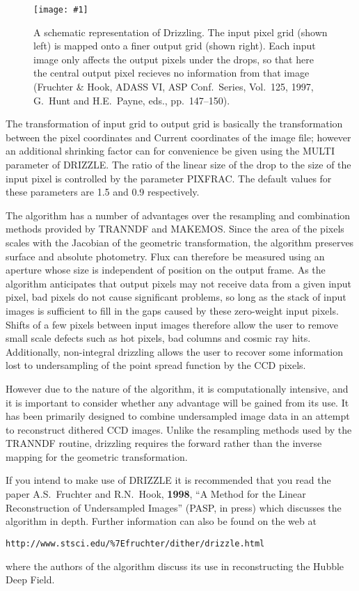 \documentclass[twoside,11pt]{article}
\newcommand{\htmladdnormallink}[2]{#1}
\newcommand{\htmladdimg}[1]{}
\renewcommand{\_}{\texttt{\symbol{95}}}
\newcommand{\routine}[1]{{\sc #1}}
\newcommand{\myfig} [5] {
  \begin{figure}
    \centering\texttt{[image: \#1]}
    \typeout{#1 inserted on page \arabic{page}}
    \caption{\label{#4}#5}
  \end{figure}
  }
\newcommand{\myfig}[5]{
    \htmladdimg{#3}\\
    Figure: \label{#4} #5
    }
\begin{document}
\myfig{sun139driz.eps}{height=0.5\textheight}{driz.gif}{drizzlepicture}
{A schematic representation of Drizzling. The input pixel grid
(shown left) is mapped onto a finer output grid (shown right).
Each input image only affects the output pixels under the drops,
so that here the central output pixel recieves no information
from that image (Fruchter \& Hook, ADASS VI,
ASP Conf.\ Series, Vol.\ 125, 1997, G.~Hunt and H.E.~Payne, eds., pp.\
147--150).}

The transformation of input grid to output grid is basically the 
transformation between the pixel coordinates and Current coordinates
of the image file;
however an additional shrinking
factor can for convenience be given using the MULTI 
parameter of DRIZZLE.  The ratio of the linear size of the
drop to the size of the input pixel is controlled by the
parameter PIXFRAC.  The default values for these
parameters are 1.5 and 0.9 respectively.

The algorithm has a number of advantages over the resampling and
combination methods provided by \routine{TRANNDF} and \routine{MAKEMOS}.
Since the area of the
pixels scales with the Jacobian of the geometric transformation, the
algorithm preserves surface and absolute photometry. Flux can therefore
be measured using an aperture whose size is independent of position on
the output frame. As the algorithm anticipates that output pixels may not
receive data from a given input pixel, bad pixels do not cause significant
problems, so long as the stack of input images is sufficient to fill
in the gaps caused by these zero-weight input pixels. Shifts of a few
pixels between input images therefore allow the user to remove small scale
defects such as hot pixels, bad columns and cosmic ray hits. Additionally,
non-integral drizzling allows the user to recover some information lost
to undersampling of the point spread function by the CCD pixels.

However due to the nature of the algorithm, it is computationally
intensive, and it is important to consider whether any advantage will
be gained from its use. It has been primarily designed to combine
undersampled image data in an attempt to reconstruct dithered
CCD images.  Unlike the resampling methods used by the \routine{TRANNDF}
routine, drizzling requires the forward rather than the inverse
mapping for the geometric transformation.

If you intend to make use of \routine{DRIZZLE} it is
recommended that you read the paper 
A.S.~Fruchter and R.N.~Hook, {\bf 1998},
``A Method for the Linear Reconstruction of Undersampled Images''
(\htmladdnormallink{PASP, in
press}{http://xxx.soton.ac.uk/abs/astro-ph/9808087}) which discusses the
algorithm in depth. Further information can also be found on the web at
\htmladdnormallink{
{\tt http://www.stsci.edu/\%7Efruchter/dither/drizzle.html}
}{http://www.stsci.edu/~fruchter/dither/drizzle.html}
where the authors of the algorithm discuss its use in reconstructing
the Hubble Deep Field.
\end{document}
